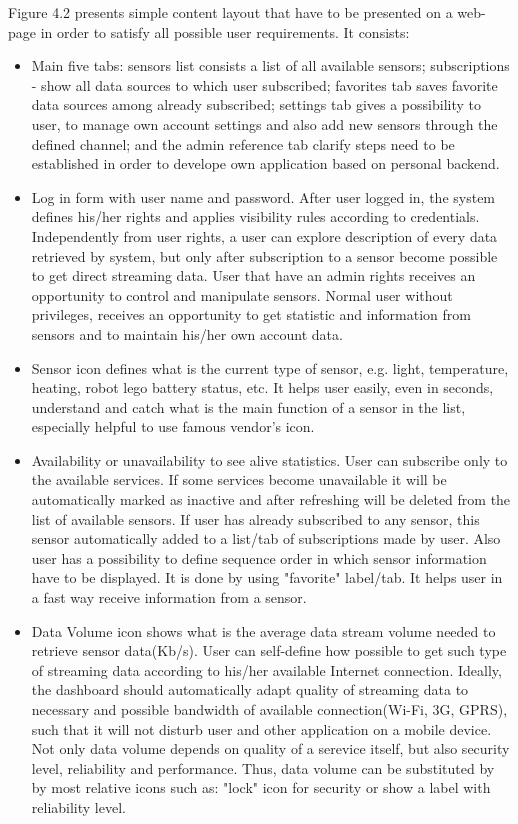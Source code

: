     Figure 4.2 presents simple content layout that have to be presented on a web-page in order to satisfy all possible user requirements. It consists:
      \begin{itemize}
      \item Main five tabs: sensors list consists a list of all available sensors; subscriptions - show all data sources to which user subscribed; favorites tab saves favorite data sources among already subscribed; settings tab gives a possibility to user, to manage own account settings and also add new sensors through the defined channel; and the admin reference tab clarify steps need to be established in order to develope own application based on personal backend.
      \item Log in form with user name and password. After user logged in, the system defines his/her rights and applies visibility rules according to credentials. Independently from user rights, a user can explore description of every data retrieved by system, but only after subscription to a sensor become possible to get direct streaming data. User that have an admin rights receives an opportunity to control and manipulate sensors. Normal user without privileges, receives an opportunity to get statistic and information from sensors and to maintain his/her own account data.
      \item Sensor icon defines what is the current type of sensor, e.g. light, temperature, heating, robot lego battery status, etc. It helps user easily, even in seconds, understand and catch what is the main function of a sensor in the list, especially helpful to use famous vendor's icon.
      \item Availability or unavailability to see alive statistics. User can subscribe only to the available services. If some services become unavailable it will be automatically marked as inactive and after refreshing will be deleted from the list of available sensors. If user has already subscribed to any sensor, this sensor automatically added to a list/tab of subscriptions made by user. Also user has a possibility to define sequence order in which sensor information have to be displayed. It is done by using "favorite" label/tab. It helps user in a fast way receive information from a sensor.
      \item Data Volume icon shows what is the average data stream volume needed to retrieve sensor data(Kb/s). User can self-define how possible to get such type of streaming data according to his/her available Internet connection. Ideally, the dashboard should automatically adapt quality of streaming data to necessary and possible bandwidth of available connection(Wi-Fi, 3G, GPRS), such that it will not disturb user and other application on a mobile device. Not only data volume depends on quality of a serevice itself, but also security level, reliability and performance. Thus, data volume can be substituted by by most relative icons such as: "lock" icon for security or show a label with reliability level.

\end{itemize}
